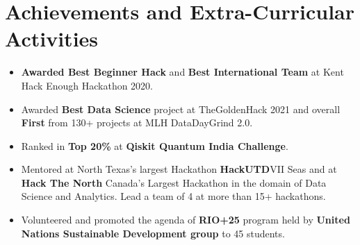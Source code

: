 \documentclass[letterpaper,11pt]{article}
\newcommand{\resumeItem}[1]{
  \item\small{
    {#1 \vspace{-2pt}}
  }
}
\newcommand{\resumeItemListStart}{\begin{itemize}}
\newcommand{\resumeItemListEnd}{\end{itemize}\vspace{-5pt}}
\begin{document}

 


\section{Achievements and Extra-Curricular Activities}
    \resumeItemListStart
        \resumeItem{\textbf{Awarded Best Beginner Hack} and \textbf{Best International Team} at Kent Hack Enough Hackathon 2020.}
        \resumeItem{Awarded \textbf{Best Data Science} project at TheGoldenHack 2021 and overall \textbf{First} from 130+ projects at MLH DataDayGrind 2.0. }
        \resumeItem{Ranked in \textbf{Top 20\%} at \textbf{Qiskit Quantum India Challenge}.}
        \resumeItem{Mentored at North Texas's largest Hackathon \textbf{HackUTD}VII Seas and at \textbf{Hack The North} Canada's Largest Hackathon in the domain of Data Science and Analytics. Lead a team of 4 at more than 15+ hackathons.}
        \resumeItem{Volunteered and promoted the agenda of \textbf{RIO+25} program held by \textbf{United Nations Sustainable Development group} to 45 students.}
    \resumeItemListEnd
\end{document}
